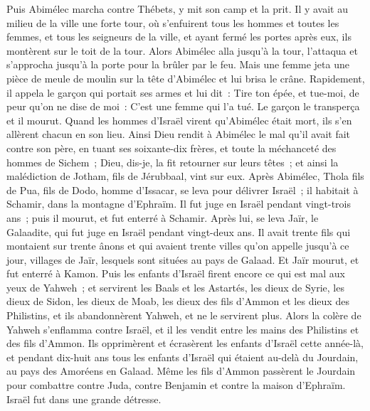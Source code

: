 \begin{multicols}{2}
Puis Abimélec marcha contre Thébets, y mit son camp et la prit.
Il y avait au milieu de la ville une forte tour, où s'enfuirent tous les hommes et toutes les femmes, et tous les seigneurs de la ville, et ayant fermé les portes après eux, ils montèrent sur le toit de la tour.
Alors Abimélec alla jusqu'à la tour, l'attaqua et s'approcha jusqu'à la porte pour la brûler par le feu.
Mais une femme jeta une pièce de meule de moulin sur la tête d'Abimélec et lui brisa le crâne.
Rapidement, il appela le garçon qui portait ses armes et lui dit~: Tire ton épée, et tue-moi, de peur qu'on ne dise de moi~: C'est une femme qui l'a tué. Le garçon le transperça et il mourut.
Quand les hommes d'Israël virent qu'Abimélec était mort, ils s'en allèrent chacun en son lieu.
Ainsi Dieu rendit à Abimélec le mal qu'il avait fait contre son père, en tuant ses soixante-dix frères,
et toute la méchanceté des hommes de Sichem~; Dieu, dis-je, la fit retourner sur leurs têtes~; et ainsi la malédiction de Jotham, fils de Jérubbaal, vint sur eux.
\VerseOne{}Après Abimélec, Thola fils de Pua, fils de Dodo, homme d'Issacar, se leva pour délivrer Israël~; il habitait à Schamir, dans la montagne d'Ephraïm.
Il fut juge en Israël pendant vingt-trois ans~; puis il mourut, et fut enterré à Schamir.
Après lui, se leva Jaïr, le Galaadite, qui fut juge en Israël pendant vingt-deux ans.
Il avait trente fils qui montaient sur trente ânons et qui avaient trente villes qu'on appelle jusqu'à ce jour, villages de Jaïr, lesquels sont situées au pays de Galaad.
Et Jaïr mourut, et fut enterré à Kamon.
Puis les enfants d'Israël firent encore ce qui est mal aux yeux de Yahweh~; et servirent les Baals et les Astartés, les dieux de Syrie, les dieux de Sidon, les dieux de Moab, les dieux des fils d'Ammon et les dieux des Philistins, et ils abandonnèrent Yahweh, et ne le servirent plus.
Alors la colère de Yahweh s'enflamma contre Israël, et il les vendit entre les mains des Philistins et des fils d'Ammon.
Ils opprimèrent et écrasèrent les enfants d'Israël cette année-là, et pendant dix-huit ans tous les enfants d'Israël qui étaient au-delà du Jourdain, au pays des Amoréens en Galaad.
Même les fils d'Ammon passèrent le Jourdain pour combattre contre Juda, contre Benjamin et contre la maison d'Ephraïm. Israël fut dans une grande détresse.

\end{multicols}

